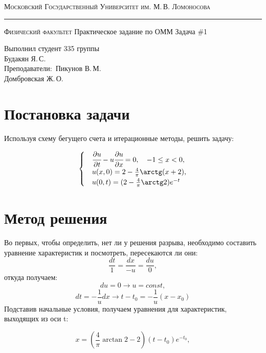 \documentclass[12pt]{article}
\author{Будакян Я. С.}
\def\dd#1#2{\cfrac{\partial#1}{\partial#2}}
\begin{document}
	\begin{titlepage}
		\begin{center}
			{\small\textsc{Московский Государственный Университет им. М.\,В. Ломоносова}}
			\vskip 1pt \hrule \vskip 3pt
			{\small\textsc{Физический факультет}}
			\vfill
			{\Large Практическое задание по ОММ}
			\break
			\break
			{\Large Задача \#1}	
		\end{center}
		
		\vfill
		
		\begin{flushright}
			{Выполнил студент 335 группы\\Будакян Я.\,С.\\
			 Преподаватели:\ Пикунов В.\,М. \\ Домбровская Ж.\,О.}
		\end{flushright}
	\end{titlepage}
	
	\section{Постановка задачи}
		\bigskip\par{}
		Используя схему бегущего счета и итерационные методы, решить задачу:
		
		\begin{equation}\label{eq:problem}
			\begin{cases}
				&\dd{u}t - u\dd{u}x = 0, \quad -1 \le x < 0, \\
				&u(x, 0) = 2 - \frac{4}{\pi}\arctg(x+2), \\
				&u(0, t) = (2 - \frac{4}{\pi}\arctg2)e^{-t}
			\end{cases}
		\end{equation}
	
	\section{Метод решения}
		Во первых, чтобы определить, нет ли у решения разрыва, необходимо составить уравнение характеристик и посмотреть, пересекаются ли они:
		$$ \frac{dt}{1} = \frac{dx}{-u} = \frac{du}{0},$$
		откуда получаем:
		$$ du = 0 \rightarrow u = const,$$
		$$ dt = -\frac{1}{u}dx \rightarrow t - t_0 = -\frac{1}{u}(x - x_0)$$
		Подставив начальные условия, получаем уравнения для характеристик, выходящих из оси t:
		
		\begin{equation}\label{char_t0}
			x = (\frac{4}{\pi}\arctan2-2)(t-t_0)e^{-t_0},
		\end{equation}
		
\end{document}
